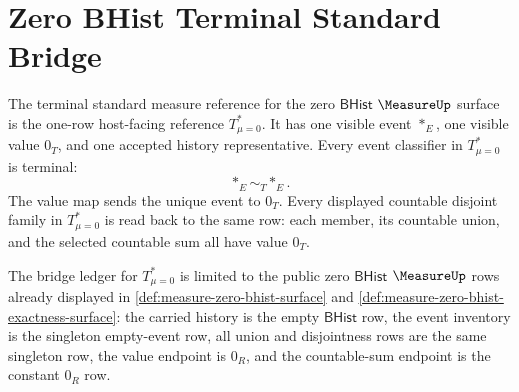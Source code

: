 \section*{Zero BHist Terminal Standard Bridge}

\begin{definition}
\label{def:measure-zero-bhist-terminal-standard-reference}
The terminal standard measure reference for the zero $\mathsf{BHist}$
$\MeasureUp$ surface is the one-row host-facing reference
$T_{\mu=0}^{\ast}$. It has one visible event $\ast_E$, one visible value
$0_T$, and one accepted history representative. Every event classifier in
$T_{\mu=0}^{\ast}$ is terminal:
$$
\ast_E\sim_T\ast_E.
$$
The value map sends the unique event to $0_T$. Every displayed countable
disjoint family in $T_{\mu=0}^{\ast}$ is read back to the same row: each member,
its countable union, and the selected countable sum all have value $0_T$.

The bridge ledger for $T_{\mu=0}^{\ast}$ is limited to the public zero
$\mathsf{BHist}$ $\MeasureUp$ rows already displayed in
\autoref{def:measure-zero-bhist-surface} and
\autoref{def:measure-zero-bhist-exactness-surface}: the carried history is the
empty $\mathsf{BHist}$ row, the event inventory is the singleton empty-event
row, all union and disjointness rows are the same singleton row, the value
endpoint is $0_R$, and the countable-sum endpoint is the constant $0_R$ row.
\end{definition}

